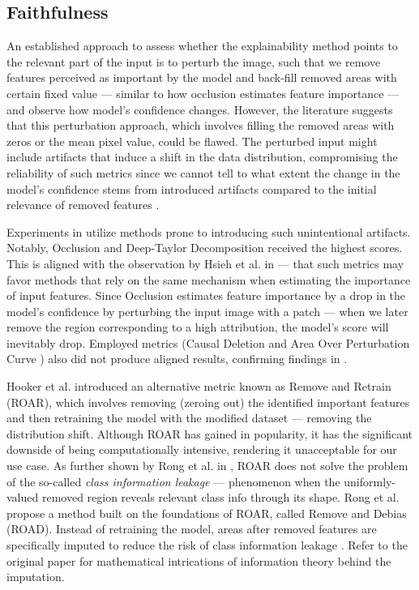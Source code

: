 \subsection*{Faithfulness}

An established approach to assess whether the explainability method points to the relevant part of the input is to perturb the image, such that we remove features perceived as important by the model and back-fill removed areas with certain fixed value --- similar to how occlusion estimates feature importance --- and observe how model's confidence changes.
However, the literature suggests that this perturbation approach, which involves filling the removed areas with zeros or the mean pixel value, could be flawed.
The perturbed input might include artifacts that induce a shift in the data distribution, compromising the reliability of such metrics since we cannot tell to what extent the change in the model's confidence stems from introduced artifacts compared to the initial relevance of removed features \cite{roar}.

Experiments in \cite{gallo} utilize methods prone to introducing such unintentional artifacts.
Notably, Occlusion and Deep-Taylor Decomposition \cite{xai-dtd} received the highest scores.
This is aligned with the observation by Hsieh et al. in \cite{xai-hsieh-occ-dtd} --- that such metrics may favor methods that rely on the same mechanism when estimating the importance of input features.
Since Occlusion estimates feature importance by a drop in the model's confidence by perturbing the input image with a patch --- when we later remove the region corresponding to a high attribution, the model's score will inevitably drop.
Employed metrics (Causal Deletion \cite{xai-causal-deletion} and Area Over Perturbation Curve \cite{xai-aopc}) also did not produce aligned results, confirming findings in \cite{roar}.

Hooker et al. \cite{roar} introduced an alternative metric known as Remove and Retrain (ROAR), which involves removing (zeroing out) the identified important features and then retraining the model with the modified dataset --- removing the distribution shift.
Although ROAR has gained in popularity, it has the significant downside of being computationally intensive, rendering it unacceptable for our use case.
As further shown by Rong et al. in \cite{road}, ROAR does not solve the problem of the so-called \emph{class information leakage} --- phenomenon when the uniformly-valued removed region reveals relevant class info through its shape.
Rong et al. propose a method built on the foundations of ROAR, called Remove and Debias (ROAD).
Instead of retraining the model, areas after removed features are specifically imputed to reduce the risk of class information leakage \cite{road}. Refer to the original paper for mathematical intrications of information theory behind the imputation.

